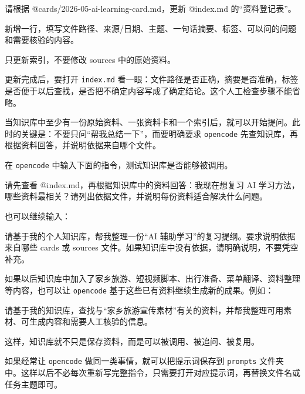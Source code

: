 \begin{tcolorbox}[filebox,title=提示词或示例内容]
请根据 @cards/2026-05-ai-learning-card.md，更新 @index.md 的“资料登记表”。

新增一行，填写文件路径、来源/日期、主题、一句话摘要、标签、可以问的问题和需要核验的内容。

只更新索引，不要修改 sources 中的原始资料。
\end{tcolorbox}

更新完成后，要打开 \texttt{index.md} 看一眼：文件路径是否正确，摘要是否准确，标签是否便于以后查找，是否把不确定内容写成了确定结论。这个人工检查步骤不能省略。

当知识库中至少有一份原始资料、一张资料卡和一个索引后，就可以开始提问。此时的关键是：不要只问“帮我总结一下”，而要明确要求 \texttt{opencode} 先查知识库，再根据资料回答，并说明依据来自哪个文件。

\begin{tcolorbox}[stepbox,title=操作 7：基于知识库提问]
在 \texttt{opencode} 中输入下面的指令，测试知识库是否能够被调用。
\end{tcolorbox}

\begin{tcolorbox}[filebox,title=提示词或示例内容]
请先查看 @index.md，再根据知识库中的资料回答：我现在想复习 AI 学习方法，哪些资料最相关？请列出依据文件，并说明每份资料适合解决什么问题。
\end{tcolorbox}

也可以继续输入：

\begin{tcolorbox}[filebox,title=提示词或示例内容]
请基于我的个人知识库，帮我整理一份“AI 辅助学习”的复习提纲。要求说明依据来自哪些 cards 或 sources 文件。如果知识库中没有依据，请明确说明，不要凭空补充。
\end{tcolorbox}

如果以后知识库中加入了家乡旅游、短视频脚本、出行准备、菜单翻译、资料整理等内容，也可以让 \texttt{opencode} 基于这些已有资料继续生成新的成果。例如：

\begin{tcolorbox}[filebox,title=提示词或示例内容]
请基于我的知识库，查找与“家乡旅游宣传素材”有关的资料，并帮我整理可用素材、可生成内容和需要人工核验的信息。
\end{tcolorbox}

这样，知识库就不只是保存资料，而是可以被调用、被追问、被复用。

如果经常让 \texttt{opencode} 做同一类事情，就可以把提示词保存到 \texttt{prompts} 文件夹中。这样以后不必每次重新写完整指令，只需要打开对应提示词，再替换文件名或任务主题即可。

